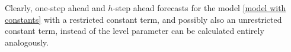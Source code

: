 \documentclass[article]{jss}
\newcommand{\fct}[1]{\code{#1()}}
\begin{document}
Clearly, one-step ahead and $h$-step ahead forecasts for the model \eqref{model with constants} with a restricted constant term, and possibly also an unrestricted constant term, instead of the level parameter can be calculated entirely analogously.




%

\end{document}
